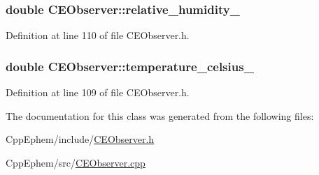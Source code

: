 \subsubsection[{relative\+\_\+humidity\+\_\+}]{\setlength{\rightskip}{0pt plus 5cm}double C\+E\+Observer\+::relative\+\_\+humidity\+\_\+\hspace{0.3cm}{\ttfamily [protected]}}\label{class_c_e_observer_a1517a290b142b72e5f82a5a42bc9f565}


Definition at line 110 of file C\+E\+Observer.\+h.

\hypertarget{class_c_e_observer_ac29e9479df58bd3bed6d4b749747b2bd}{}
\subsubsection[{temperature\+\_\+celsius\+\_\+}]{\setlength{\rightskip}{0pt plus 5cm}double C\+E\+Observer\+::temperature\+\_\+celsius\+\_\+\hspace{0.3cm}{\ttfamily [protected]}}\label{class_c_e_observer_ac29e9479df58bd3bed6d4b749747b2bd}


Definition at line 109 of file C\+E\+Observer.\+h.



The documentation for this class was generated from the following files\+:\begin{DoxyCompactItemize}
\item 
Cpp\+Ephem/include/\hyperlink{_c_e_observer_8h}{C\+E\+Observer.\+h}\item 
Cpp\+Ephem/src/\hyperlink{_c_e_observer_8cpp}{C\+E\+Observer.\+cpp}\end{DoxyCompactItemize}
